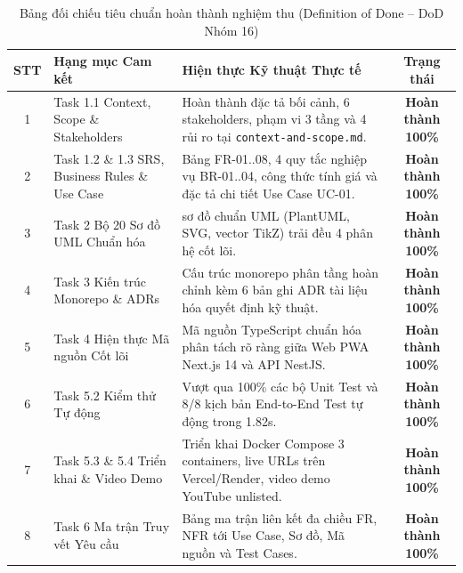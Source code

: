 \documentclass[a4paper]{article}
\begin{document}
\begin{table}[H]
\centering
\small
\begin{tabular}{|c|>{\raggedright\arraybackslash}p{4.0cm}|>{\raggedright\arraybackslash}p{7.2cm}|c|}
\hline
\textbf{STT} & \textbf{Hạng mục Cam kết} & \textbf{Hiện thực Kỹ thuật Thực tế} & \textbf{Trạng thái} \\ \hline
1 & Task 1.1 Context, Scope \& Stakeholders & Hoàn thành đặc tả bối cảnh, 6 stakeholders, phạm vi 3 tầng và 4 rủi ro tại \texttt{context-and-scope.md}. & \textbf{Hoàn thành 100\%} \\ \hline
2 & Task 1.2 \& 1.3 SRS, Business Rules \& Use Case & Bảng FR-01..08, 4 quy tắc nghiệp vụ BR-01..04, công thức tính giá và đặc tả chi tiết Use Case UC-01. & \textbf{Hoàn thành 100\%} \\ \hline
3 & Task 2 Bộ 20 Sơ đồ UML Chuẩn hóa & 20 sơ đồ chuẩn UML (PlantUML, SVG, vector TikZ) trải đều 4 phân hệ cốt lõi. & \textbf{Hoàn thành 100\%} \\ \hline
4 & Task 3 Kiến trúc Monorepo \& ADRs & Cấu trúc monorepo phân tầng hoàn chỉnh kèm 6 bản ghi ADR tài liệu hóa quyết định kỹ thuật. & \textbf{Hoàn thành 100\%} \\ \hline
5 & Task 4 Hiện thực Mã nguồn Cốt lõi & Mã nguồn TypeScript chuẩn hóa phân tách rõ ràng giữa Web PWA Next.js 14 và API NestJS. & \textbf{Hoàn thành 100\%} \\ \hline
6 & Task 5.2 Kiểm thử Tự động & Vượt qua 100\% các bộ Unit Test và 8/8 kịch bản End-to-End Test tự động trong 1.82s. & \textbf{Hoàn thành 100\%} \\ \hline
7 & Task 5.3 \& 5.4 Triển khai \& Video Demo & Triển khai Docker Compose 3 containers, live URLs trên Vercel/Render, video demo YouTube unlisted. & \textbf{Hoàn thành 100\%} \\ \hline
8 & Task 6 Ma trận Truy vết Yêu cầu & Bảng ma trận liên kết đa chiều FR, NFR tới Use Case, Sơ đồ, Mã nguồn và Test Cases. & \textbf{Hoàn thành 100\%} \\ \hline
\end{tabular}
\caption{Bảng đối chiếu tiêu chuẩn hoàn thành nghiệm thu (Definition of Done -- DoD Nhóm 16)}
\label{tab:dod}
\end{table}
\end{document}
